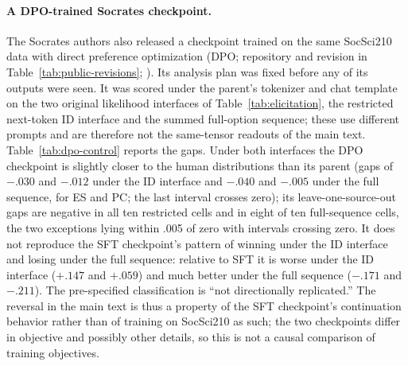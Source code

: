 \documentclass[11pt]{article}
\newcommand{\ES}{\textsc{ES}}
\newcommand{\PC}{\textsc{PC}}
\begin{document}
\paragraph{A DPO-trained Socrates checkpoint.}
The Socrates authors also released a checkpoint trained on the same SocSci210
data with direct preference optimization (DPO; repository and revision in
Table~\ref{tab:public-revisions};
\citealp{socrates-qwen25-14b-dpo-hf,kolluri-etal-2025-finetuning}). Its
analysis plan was fixed before any of its outputs were seen. It was scored
under the parent's tokenizer and chat template on the two original likelihood
interfaces of Table~\ref{tab:elicitation}, the restricted next-token ID
interface and the summed full-option sequence; these use different prompts
and are therefore not the same-tensor readouts of the main text.
Table~\ref{tab:dpo-control} reports the gaps. Under both interfaces the DPO
checkpoint is slightly closer to the human distributions than its parent
(gaps of $-.030$ and $-.012$ under the ID interface and $-.040$ and $-.005$
under the full sequence, for \ES{} and \PC{}; the last interval crosses
zero); its leave-one-source-out gaps are negative in all
ten restricted cells and in eight of ten full-sequence cells, the two
exceptions lying within .005 of zero with intervals crossing zero. It does
not reproduce the SFT checkpoint's pattern of winning under the ID interface
and losing under the full sequence: relative to SFT it is worse under the ID interface ($+.147$ and $+.059$) and
much better under the full sequence ($-.171$ and $-.211$). The pre-specified classification is ``not directionally
replicated.'' The reversal in the main text is thus a property of the SFT
checkpoint's continuation behavior rather than of training on SocSci210 as
such; the two checkpoints differ in objective and possibly other details, so
this is not a causal comparison of training objectives.
\end{document}
